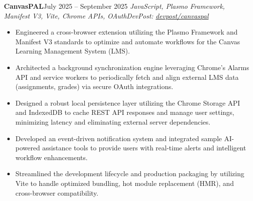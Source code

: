 \documentclass[letterpaper,11pt]{article}
\newcommand{\resumeEntry}[4]{
    \vspace{2pt}
    \noindent\textbf{#1}\hfill{#2}
    \newline
    \noindent\textit{#3}\hfill\textit{#4}
    \vspace{-3pt}
}
\newcommand{\resumeItemListStart}{\begin{itemize}[label=$\bullet$, leftmargin=1.1em, itemsep=0pt, parsep=0pt, topsep=2pt]}
\newcommand{\resumeItemListEnd}{\end{itemize}}
\begin{document}
    \resumeEntry
        {CanvasPAL}
        {July 2025 – September 2025}
        {JavaScript, Plasmo Framework, Manifest V3, Vite, Chrome APIs, OAuth}
        {DevPost: \href{https://devpost.com/software/canvaspal-skynet}{devpost/canvaspal}}
    \resumeItemListStart
        \item Engineered a cross-browser extension utilizing the Plasmo Framework and Manifest V3 standards to optimize and automate workflows for the Canvas Learning Management System (LMS).
        \item Architected a background synchronization engine leveraging Chrome's Alarms API and service workers to periodically fetch and align external LMS data (assignments, grades) via secure OAuth integrations.
        \item Designed a robust local persistence layer utilizing the Chrome Storage API and IndexedDB to cache REST API responses and manage user settings, minimizing latency and eliminating external server dependencies.
        \item Developed an event-driven notification system and integrated sample AI-powered assistance tools to provide users with real-time alerts and intelligent workflow enhancements.
        \item Streamlined the development lifecycle and production packaging by utilizing Vite to handle optimized bundling, hot module replacement (HMR), and cross-browser compatibility.
    \resumeItemListEnd
\end{document}
